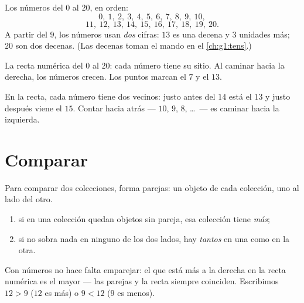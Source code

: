 \begin{example}\label{ex:g1:counting:writing}
Los números del $0$ al $20$, en orden:
\[
0,\ 1,\ 2,\ 3,\ 4,\ 5,\ 6,\ 7,\ 8,\ 9,\ 10,
\]
\[
11,\ 12,\ 13,\ 14,\ 15,\ 16,\ 17,\ 18,\ 19,\ 20 .
\]
A partir del $9$, los números usan \emph{dos} cifras: $13$ es una decena y $3$
unidades más; $20$ son dos decenas. (Las decenas toman el mando en el
\cref{ch:g1:tens}.)
\end{example}

\begin{omfigure}

{\small La recta numérica del $0$ al $20$: cada número tiene su sitio.
Al caminar hacia la derecha, los números crecen. Los puntos marcan el $7$ y el $13$.}
\end{omfigure}

\begin{example}\label{ex:g1:counting:neighbors}
En la recta, cada número tiene dos vecinos: justo antes del $14$ está
el $13$ y justo después viene el $15$. Contar hacia atrás --- $10$, $9$, $8$,
\dots\ --- es caminar hacia la izquierda.
\end{example}

\section{Comparar}

\begin{method}\label{met:g1:counting:compare}
Para comparar dos colecciones, forma parejas: un objeto de cada
colección, uno al lado del otro.
\begin{enumerate}
  \item si en una colección quedan objetos sin pareja,
        esa colección tiene \emph{más};
  \item si no sobra nada en ninguno de los dos lados, hay
        \emph{tantos} en una como en la otra.
\end{enumerate}
Con números no hace falta emparejar: el que está más a la derecha en la
recta numérica es el mayor --- las parejas y la recta siempre coinciden.
Escribimos $12 > 9$ ($12$ es más) o $9 < 12$ ($9$ es menos).
\end{method}

